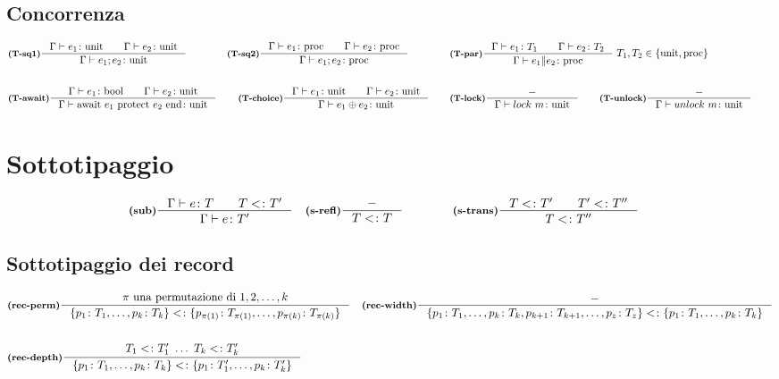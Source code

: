 \documentclass[a4paper, 10pt]{article}
\newcommand{\bool}{\textup{bool}}
\theoremstyle{definition}
\newcommand{\infer}[4]{\inference[\textbf{#1}]{#2}{#3}#4 }
\begin{document}
\begin{minipage}{.45\linewidth}
	\begin{flushleft} 
    \subsection*{Concorrenza}
	\begin{align*}
		&\infer{(T-sq1)}{\Gamma\vdash e_1\colon\textup{unit}\qquad \Gamma\vdash e_2\colon\textup{unit}}{\Gamma\vdash e_1;e_2\colon \textup{unit}}{} 
		&\infer{(T-sq2)}{\Gamma\vdash e_1\colon\textup{proc}\qquad \Gamma\vdash e_2\colon\textup{proc}}{\Gamma\vdash e_1;e_2\colon \textup{proc}}{} \qquad\qquad
		&\infer{(T-par)}{\Gamma\vdash e_1\colon T_1\qquad \Gamma\vdash e_2\colon T_2}{\Gamma\vdash e_1 \| e_2\colon \textup{proc}}{\ T_1, T_2 \in \{\textup{unit}, \textup{proc}\}} \\ \\
		&\infer{(T-await)}{\Gamma\vdash e_1 \colon \bool\qquad \Gamma\vdash e_2\colon \textup{unit}}{
		\Gamma\vdash \textup{await}\ e_1\ \textup{protect}\ e_2\ \textup{end}\colon \textup{unit} }{} 
		&\infer{(T-choice)}{\Gamma\vdash e_1 \colon \textup{unit}\qquad \Gamma\vdash e_2\colon \textup{unit}}{\Gamma\vdash e_1 \oplus e_2\colon \textup{unit}}{}\qquad
		&\infer{(T-lock)}{-}{\Gamma\vdash lock\ m\colon \textup{unit}}\qquad
		\infer{(T-unlock)}{-}{\Gamma\vdash unlock\ m\colon \textup{unit}}\qquad
		\end{align*}
		\section*{Sottotipaggio}
	\begin{align*}
		&\infer{(sub)}{\Gamma\vdash e \colon T\qquad T<\colon T'}{\Gamma\vdash e\colon T'}{}
		&\infer{(s-refl)}{-}{T<\colon T}{} \qquad\qquad
		&\infer{(s-trans)}{T<\colon T'\qquad T'<\colon T''}{T<\colon T''}{}
	\end{align*}
\subsection*{Sottotipaggio dei record}
	\begin{align*}
		&\infer{(rec-perm)}{\pi\ \textup{una permutazione di } 1,2,\dots, k}{
			\{p_1\colon T_1, \dots,p_k\colon T_k\}<\colon \{p_{\pi(1)}\colon T_{\pi (1)},\dots, p_{\pi(k)}\colon T_{\pi(k)} \}}{}
		&\infer{(rec-width)}{-}{\{p_1\colon T_1,\dots,p_k\colon T_k, p_{k+1}\colon T_{k+1},\dots, p_z\colon T_z \} <\colon \{p_1\colon T_1,\dots, p_k\colon T_k \}}{} \\ \\
		&\infer{(rec-depth)}{T_1<\colon T_1'\ \dots\ T_k<\colon T_k'}{\{ p_1\colon T_1,\dots , p_k\colon T_k \} <\colon \{ p_1\colon T_1',\dots,p_k\colon T_k'\}}{}
	\end{align*}
	

\end{flushleft}
\end{minipage}
\end{document}
